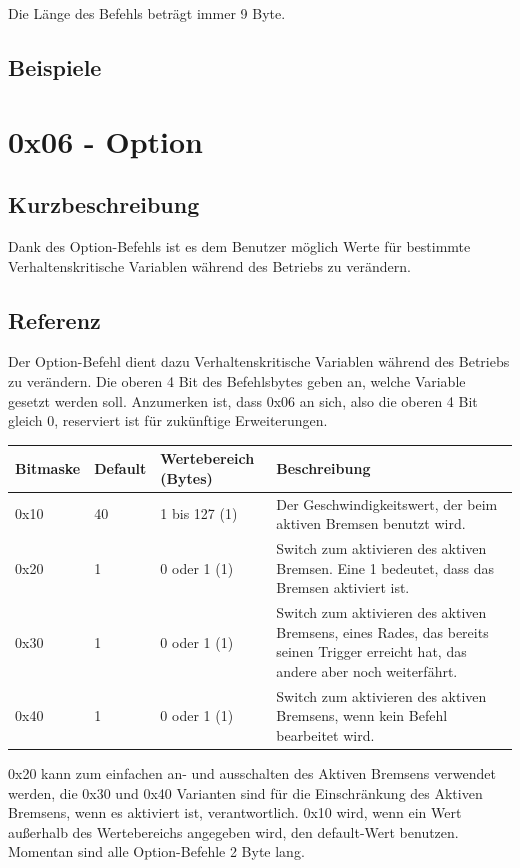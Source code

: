 \documentclass[a4paper]{article}
\begin{document}
	Die Länge des Befehls beträgt immer 9 Byte.

	\subsection{Beispiele}
	\pagebreak


	\section{0x06 - Option}

	\subsection{Kurzbeschreibung}

	Dank des Option-Befehls ist es dem Benutzer möglich Werte für bestimmte Verhaltenskritische Variablen während des
	Betriebs zu verändern.

	\subsection{Referenz}

	Der Option-Befehl dient dazu Verhaltenskritische Variablen während des Betriebs zu verändern.
	Die oberen 4 Bit des Befehlsbytes geben an, welche Variable gesetzt werden soll. Anzumerken ist,
	dass 0x06 an sich, also die oberen 4 Bit gleich 0, reserviert ist für zukünftige Erweiterungen.

	\begin{tabularx}{\linewidth}{|l|l|l|X|}
		\hline
		\textbf{Bitmaske} & \textbf{Default} & \textbf{Wertebereich (Bytes)} & \textbf{Beschreibung} \\
		\hline
		\hline
		0x10 & 40 & 1 bis 127 (1) & Der Geschwindigkeitswert, der beim aktiven Bremsen benutzt wird. \\
		\hline
		0x20 & 1 & 0 oder 1 (1) & Switch zum aktivieren des aktiven Bremsen. Eine 1 bedeutet, dass das Bremsen aktiviert ist. \\
		\hline
		0x30 & 1 & 0 oder 1 (1) & Switch zum aktivieren des aktiven Bremsens, eines Rades, das bereits seinen Trigger erreicht hat, das andere aber noch weiterfährt. \\
		\hline
		0x40 & 1 & 0 oder 1 (1) & Switch zum aktivieren des aktiven Bremsens, wenn kein Befehl bearbeitet wird. \\
		\hline
	\end{tabularx}

	0x20 kann zum einfachen an- und ausschalten des Aktiven Bremsens verwendet werden,
	die 0x30 und 0x40 Varianten sind für die Einschränkung des Aktiven Bremsens, wenn es
	aktiviert ist, verantwortlich. 0x10 wird, wenn ein Wert außerhalb des Wertebereichs
	angegeben wird, den default-Wert benutzen. Momentan sind alle Option-Befehle 2 Byte lang.
\end{document}
